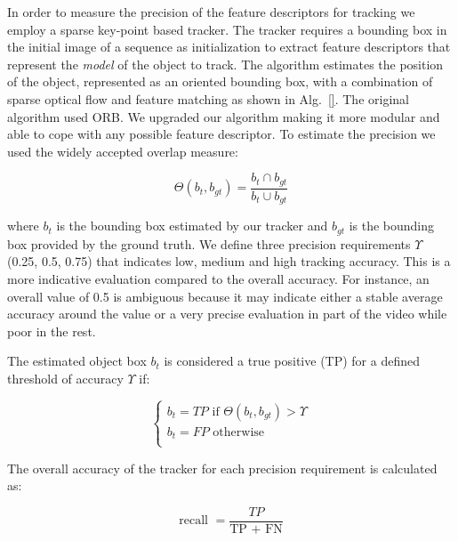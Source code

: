 In order to measure the precision of the feature descriptors for tracking we employ a sparse key-point based tracker. The tracker requires a bounding box in the initial image of a sequence as initialization to extract feature descriptors that represent the \textit{model} of the object to track. The algorithm estimates the position of the object, represented as an oriented bounding box, with a combination of sparse optical flow and feature matching as shown in Alg.~\ref{}. The original algorithm used ORB. We upgraded our algorithm making it more modular and able to cope with any possible feature descriptor. To estimate the precision we used the widely accepted overlap measure:

\begin{equation}
	\Theta (b_{t}, b_{gt}) = \frac{b_{t} \cap b_{gt}}{b_{t} \cup b_{gt}}
\end{equation}

where \textit{$b_{t}$} is the bounding box estimated by our tracker and
\textit{$b_{gt}$} is the bounding box provided by the ground truth. We define 
three precision requirements $\Upsilon$ (0.25, 0.5, 0.75) that indicates low, medium and high tracking accuracy. This is a more indicative evaluation compared to the overall accuracy. For instance, an overall value of 0.5 is ambiguous because it may indicate either a stable average accuracy around the value or a very precise evaluation in part of the video while poor in the rest.

The estimated object box \textit{$b_{t}$} is considered a true positive (TP) for a defined threshold of
accuracy $\Upsilon$ if:

\begin{equation}
\begin{cases}
b_{t} = TP  \text{ if } \Theta(b_{t}, b_{gt}) > \Upsilon \\
b_{t} = FP  \text{ otherwise }\\
\end{cases}
\end{equation}

The overall accuracy of the tracker for each precision requirement is calculated as:

\begin{equation}
\text{recall } = \frac{TP}{\text{TP } + \text{ FN}}
\end{equation}


